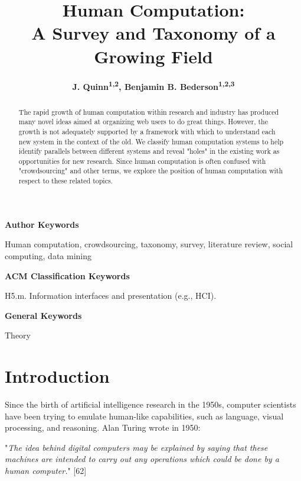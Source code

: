 \documentclass{acm_proc_article-sp}
\begin{document}
\title{Human Computation:\\ A Survey and Taxonomy of a Growing Field}
\author{
\alignauthor \large{\bf J. Quinn\textsuperscript{1,2}, Benjamin B. Bederson\textsuperscript{1,2,3}\rm}
 	 \small {}
}
\maketitle
\normalsize
\begin{abstract}
The rapid growth of human computation within research and industry has produced many novel ideas aimed at organizing web users to do great things. However, the growth is not adequately supported by a framework with which to understand each new system in the context of the old. We classify human computation systems to help identify parallels between different systems and reveal "holes" in the existing work as opportunities for new research. Since human computation is often confused with "crowdsourcing" and other terms, we explore the position of human computation with respect to these related topics.
\end{abstract}
\begin{keywords}
\textbf{Author Keywords}

Human computation, crowdsourcing, taxonomy, survey, literature review, social computing, data mining
 
\textbf{ACM Classification Keywords}

H5.m. Information interfaces and presentation (e.g., HCI).

\textbf{General Keywords}

Theory
\end{keywords}
\section*{Introduction}
\normalsize 
Since the birth of artificial intelligence research in the 1950s, computer scientists have been trying to emulate human-like capabilities, such as language, visual processing, and reasoning. Alan Turing wrote in 1950:

"\textit{The idea behind digital computers may be explained by saying that these machines are intended to carry out any operations which could be done by a human computer.}" [62]
\end{document}
